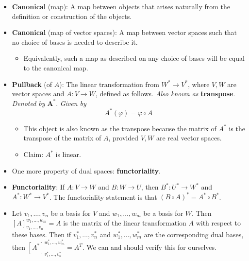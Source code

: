 \documentclass[../notes.tex]{subfiles}
\begin{document}
\begin{itemize}
\begin{itemize}
    \end{itemize}
    \item \textbf{Canonical} (map): A map between objects that arises naturally from the definition or construction of the objects.
    \item \textbf{Canonical} (map of vector spaces): A map between vector spaces such that no choice of bases is needed to describe it.
    \begin{itemize}
        \item Equivalently, such a map as described on any choice of bases will be equal to the canonical map.
    \end{itemize}
    \item \textbf{Pullback} (of $A$): The linear transformation from $W^*\to V^*$, where $V,W$ are vector spaces and $A:V\to W$, defined as follows. \emph{Also known as} \textbf{transpose}. \emph{Denoted by} $\bm{A^*}$. \emph{Given by}
    \begin{equation*}
        A^*(\varphi) = \varphi\circ A
    \end{equation*}
    \begin{itemize}
        \item This object is also known as the transpose because the matrix of $A^*$ is the transpose of the matrix of $A$, provided $V,W$ are real vector spaces.
        \item Claim: $A^*$ is linear.
    \end{itemize}
    \item One more property of dual spaces: \textbf{functoriality}.
    \item \textbf{Functoriality}: If $A:V\to W$ and $B:W\to U$, then $B^*:U^*\to W^*$ and $A^*:W^*\to V^*$. The functoriality statement is that $(B\circ A)^*=A^*\circ B^*$.
    \item Let $v_1,\dots,v_n$ be a basis for $V$ and $w_1,\dots,w_m$ be a basis for $W$. Then $[A]_{v_1,\dots,v_n}^{w_1,\dots,w_m}=A$ is the matrix of the linear transformation $A$ with respect to these bases. Then if $v_1^*,\dots,v_n^*$ and $w_1^*,\dots,w_m^*$ are the corresponding dual bases, then $[A^*]_{v_1^*,\dots,v_n^*}^{w_1^*,\dots,w_m^*}=A^T$. We can and should verify this for ourselves.

\end{itemize}
\end{document}
